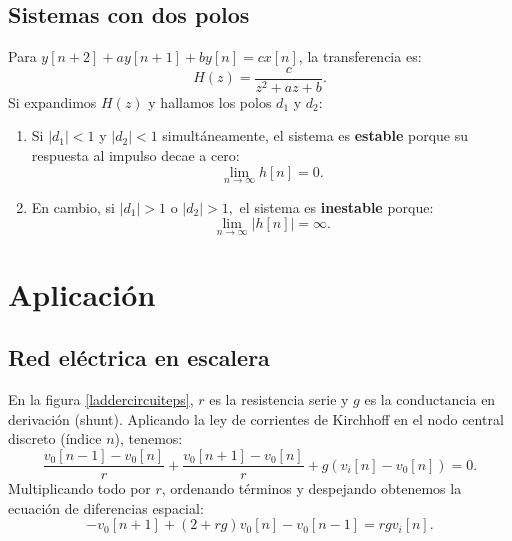 \documentclass[11pt,a4paper,openany]{book}
\begin{document}
\subsection{Sistemas con dos polos}
Para $y[n+2] + a y[n+1] + b y[n] = c x[n]$, la transferencia es:
\begin{equation}
	H(z) = \frac{c}{z^2 + a z + b}.
\end{equation}
Si expandimos $H(z)$ y hallamos los polos $d_1$ y $d_2$:
\begin{enumerate}
	\item Si $|d_1| < 1$ y $|d_2| < 1$ simultáneamente, el sistema es \textbf{estable} porque su respuesta al impulso decae a cero:
	\begin{equation}
		\lim_{n \to \infty} h[n] = 0.
	\end{equation}
	
	\item En cambio, si $|d_1| > 1$ o $|d_2| > 1,$ el sistema es \textbf{inestable} porque:
	\begin{equation}
		\lim_{n \to \infty} |h[n]| = \infty.
	\end{equation}
\end{enumerate}

\section{Aplicaci\'{o}n}

\subsection{Red el\'{e}ctrica en escalera}

En la figura \ref{laddercircuiteps}, $r$ es la resistencia serie y $g$ es la conductancia en derivación (shunt). Aplicando la ley de corrientes de Kirchhoff en el nodo central discreto (índice $n$), tenemos:
\begin{equation}
	\frac{v_0[n-1] - v_0[n]}{r} + \frac{v_0[n+1] - v_0[n]}{r} + g(v_i[n] - v_0[n]) = 0.
\end{equation}
Multiplicando todo por $r$, ordenando términos y despejando obtenemos la ecuación de diferencias espacial:
\begin{equation}
	-v_0[n+1] + (2+rg) v_0[n] - v_0[n-1] = rg v_i[n]. \label{sisCuatro}
\end{equation}
\end{document}
